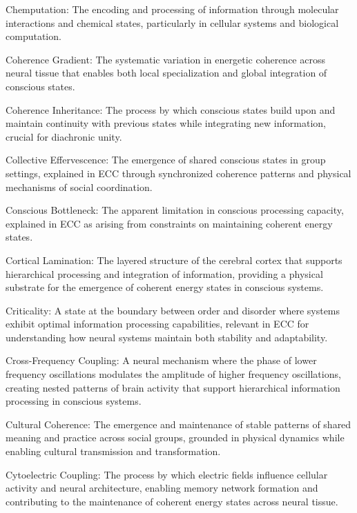 Chemputation: The encoding and processing of information through molecular interactions and chemical states, particularly in cellular systems and biological computation.

Coherence Gradient: The systematic variation in energetic coherence across neural tissue that enables both local specialization and global integration of conscious states.

Coherence Inheritance: The process by which conscious states build upon and maintain continuity with previous states while integrating new information, crucial for diachronic unity.

Collective Effervescence: The emergence of shared conscious states in group settings, explained in ECC through synchronized coherence patterns and physical mechanisms of social coordination.

Conscious Bottleneck: The apparent limitation in conscious processing capacity, explained in ECC as arising from constraints on maintaining coherent energy states.

Cortical Lamination: The layered structure of the cerebral cortex that supports hierarchical processing and integration of information, providing a physical substrate for the emergence of coherent energy states in conscious systems.

Criticality: A state at the boundary between order and disorder where systems exhibit optimal information processing capabilities, relevant in ECC for understanding how neural systems maintain both stability and adaptability.

Cross-Frequency Coupling: A neural mechanism where the phase of lower frequency oscillations modulates the amplitude of higher frequency oscillations, creating nested patterns of brain activity that support hierarchical information processing in conscious systems.

Cultural Coherence: The emergence and maintenance of stable patterns of shared meaning and practice across social groups, grounded in physical dynamics while enabling cultural transmission and transformation.

Cytoelectric Coupling: The process by which electric fields influence cellular activity and neural architecture, enabling memory network formation and contributing to the maintenance of coherent energy states across neural tissue.

